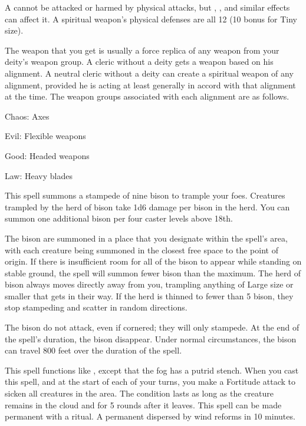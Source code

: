 \par A  cannot be attacked or harmed by physical attacks, but , , and similar effects can affect it. A spiritual weapon's physical defenses are all 12 (10 \add {} bonus for Tiny size).
\par The weapon that you get is usually a force replica of any weapon from your deity's weapon group. A cleric without a deity gets a weapon based on his alignment. A neutral cleric without a deity can create a spiritual weapon of any alignment, provided he is acting at least generally in accord with that alignment at the time. The weapon groups associated with each alignment are as follows.
\par Chaos: Axes
\par Evil: Flexible weapons
\par Good: Headed weapons
\par Law: Heavy blades

\spelldur{\durshort \dismissable}
\spelleffect This spell summons a stampede of nine bison to trample your foes. Creatures trampled by the herd of bison take 1d6 damage per bison in the herd. You can summon one additional bison per four caster levels above 18th.
\par The bison are summoned in a place that you designate within the spell's area, with each creature being summoned in the closest free space to the point of origin. If there is insufficient room for all of the bison to appear while standing on stable ground, the spell will summon fewer bison than the maximum. The herd of bison always moves directly away from you, trampling anything of Large size or smaller that gets in their way. If the herd is thinned to fewer than 5 bison, they stop stampeding and scatter in random directions.
\par The bison do not attack, even if cornered; they will only stampede. At the end of the spell's duration, the bison disappear.
\spellnotes Under normal circumstances, the bison can travel 800 feet over the duration of the spell.

\spelleffect This spell functions like , except that the fog has a putrid stench. When you cast this spell, and at the start of each of your turns, you make a Fortitude attack to sicken all creatures in the area. The condition lasts as long as the creature remains in the cloud and for 5 rounds after it leaves.
\spellnotes This spell can be made permanent with a  ritual. A permanent  dispersed by wind reforms in 10 minutes.

